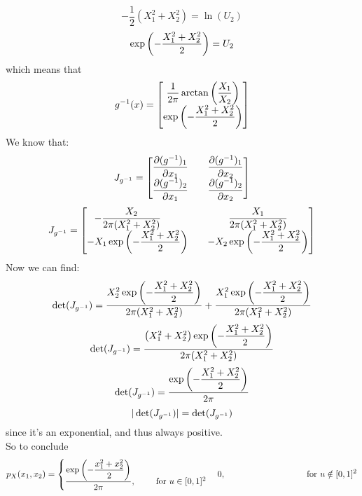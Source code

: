 \documentclass[12pt]{article}
\begin{document}
\[ -\dfrac{1}{2}(X_1^2 + X_2^2) = \ln(U_2) \]
\[ \exp\left( -\dfrac{X_1^2 + X_2^2}{2} \right) = U_2 \]
which means that
\[ g^{-1}(x) = \begin{bmatrix} 
{\dfrac{1}{2\pi}\arctan\left( \dfrac{X_1}{X_2} \right)} \\
{\exp\left( -\dfrac{X_1^2 + X_2^2}{2} \right) } \end{bmatrix} \]
We know that:
\[ J_{g\inv} = \bmat{
{\partialdd{(g\inv)_1}{x_1} \hspace{10pt}} &
{\partialdd{(g\inv)_1}{x_2} \vspace{10pt}} \\
{\partialdd{(g\inv)_2}{x_1} \hspace{10pt}} &
{\partialdd{(g\inv)_2}{x_2}}} \]
\[ J_{g\inv} = \bmat{
{-\dfrac{X_2}{2\pi(X_1^2 + X_2^2)} \hspace{30pt}
\vspace{10pt}} &
{\dfrac{X_1}{2\pi(X_1^2 + X_2^2)}} \\
{-X_1\exp\para{-\dfrac{X_1^2 + X_2^2}{2}} 
\hspace{10pt}} &
{-X_2\exp\para{-\dfrac{X_1^2 + X_2^2}{2}}}} \]
Now we can find:
\[ \det(J_{g^{-1}}) = 
\dfrac{X_2^2 \exp\left( -\dfrac{X_1^2 + X_2^2}{2} \right)}
{2\pi(X_1^2 + X_2^2)}
+ \dfrac{X_1^2 \exp\left( -\dfrac{X_1^2 + X_2^2}{2} \right)}
{2\pi(X_1^2 + X_2^2)}\]
\[ \det(J_{g^{-1}}) = 
\dfrac{\left( X_1^2 + X_2^2  \right)
\exp\left( -\dfrac{X_1^2 + X_2^2}{2} \right)}
{2\pi(X_1^2 + X_2^2)} \]
\[ \det(J_{g^{-1}}) = 
\dfrac{\exp\left( -\dfrac{X_1^2 + X_2^2}{2} \right)}{2\pi} \]
\[ |\det(J_{g^{-1}})| = \det(J_{g^{-1}}) \]
since it's an exponential,
and thus always positive. \\
So to conclude
\[ p_X(x_1, x_2) =
\begin{cases} 
\dfrac{\exp\left( -\dfrac{x_1^2 + x_2^2}{2} \right)}{2\pi}, 
\qquad \text{ for } u \in [0, 1]^2 \end{cases}
{ 0, \qquad \qquad \qquad \qquad \quad 
\text{ for } u \notin [0, 1]^2} \]
\end{document}
